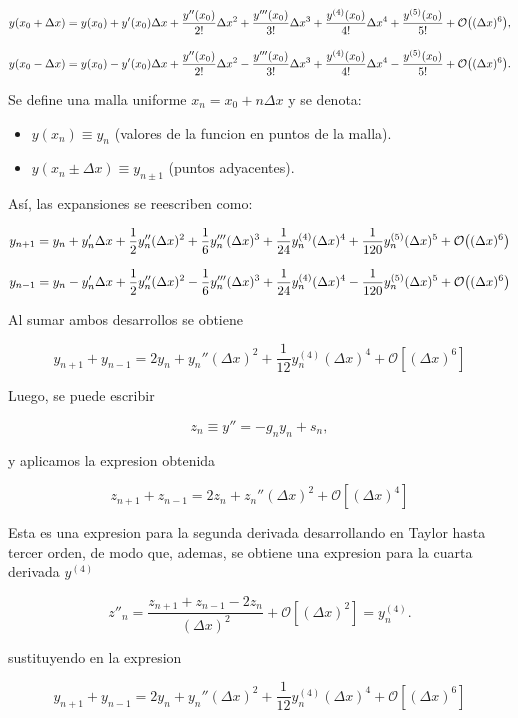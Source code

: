 \documentclass[11pt]{article}
\begin{document}
\[ y(x_{0} + \Delta x ) = y(x_{0}) + y'(x_{0})\Delta x + \frac{y''(x_{0})}{2!} \Delta x^2 + \frac{y'''(x_{0})}{3!}\Delta x^3 + \frac{y^{(4)}(x_{0})}{4!}\Delta x^4 + \frac{y^{(5)}(x_0)}{5!} + \order{(\Delta x)^6}, \]

\[ y(x_{0} - \Delta x ) = y(x_{0}) - y'(x_{0})\Delta x + \frac{y''(x_{0})}{2!} \Delta x^2 - \frac{y'''(x_{0})}{3!}\Delta x^3 + \frac{y^{(4)}(x_{0})}{4!}\Delta x^4 - \frac{y^{(5)}(x_0)}{5!} + \order{(\Delta x)^6}. \]

Se define una malla uniforme \(x_n = x_0 + n\Delta x\) y se denota:

\begin{itemize}
\item \(y(x_n) \equiv y_n\) (valores de la funcion en puntos de la malla).
\item \(y(x_n \pm \Delta x) \equiv y_{n \pm 1}\) (puntos adyacentes).
\end{itemize}

Así, las expansiones se reescriben como:

\[ y_{n+1} = y_n + y_n' \Delta x + \frac{1}{2} y_n'' (\Delta x)^2 + \frac{1}{6} y_n''' (\Delta x)^3 + \frac{1}{24} y_n^{(4)} (\Delta x)^4 + \frac{1}{120} y_n^{(5)} (\Delta x)^5 + \order{(\Delta x)^6} \]

\[ y_{n-1} = y_n - y_n' \Delta x + \frac{1}{2} y_n'' (\Delta x)^2 - \frac{1}{6} y_n''' (\Delta x)^3 + \frac{1}{24} y_n^{(4)} (\Delta x)^4 - \frac{1}{120} y_n^{(5)} (\Delta x)^5 + \order{(\Delta x)^6} \]

Al sumar ambos desarrollos se obtiene

\[ y_{n+1} + y_{n-1} = 2y_n + y_n''(\Delta x)^2 + \frac{1}{12} y_n^{(4)} (\Delta x)^4 + \mathcal{O} [(\Delta x)^6] \]

Luego, se puede escribir

\[ z_n \equiv y'' = - g_ny_n + s_n, \]

y aplicamos la expresion obtenida

\[ z_{n+1} + z_{n-1} = 2z_n + z_n'' (\Delta x)^2 + \mathcal{O}[(\Delta x)^4] \]

Esta es una expresion para la segunda derivada desarrollando en Taylor hasta tercer orden, de modo que, ademas, se obtiene una expresion para la cuarta derivada \(y^{(4)}\)

\[ z''_n = \frac{z_{n+1}+z_{n-1}-2z_n}{(\Delta x)^2} + \mathcal{O}[(\Delta x)^2] = y_n^{(4)}. \]

sustituyendo en la expresion

\[ y_{n+1} + y_{n-1} = 2y_n + y_n''(\Delta x)^2 + \frac{1}{12} y_n^{(4)} (\Delta x)^4 + \mathcal{O} [(\Delta x)^6] \]
\end{document}
